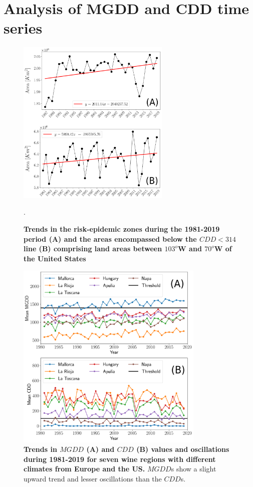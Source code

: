 \section{Analysis of MGDD and CDD time series}

\begin{figure}[H]
    \centering
    \includegraphics[width=0.65\textwidth]{Figures/CDD_risk_evol_USA.png}
    \caption[Comparison of risk areas and low CDD areas]{\textbf{Trends in the
            risk-epidemic zones during the 1981-2019
            period (A) and the areas encompassed below the $CDD < 314$ line (B)
            comprising
            land areas between $103^o$W and $70^o$W of the United States}}.
    \label{fig:sup_CDD_evol} %
\end{figure}

\begin{figure}[H]
    \centering
    \includegraphics[width=0.8\textwidth]{Figures/Mean_MGDD_CDD_sites.png}
    \caption[MGDD and CDD oscillations in different wine-growing
        regions]{\textbf{Trends in $MGDD$ (A) and $CDD$ (B) values and
            oscillations during 1981-2019 for seven wine regions with different
            climates
            from Europe and the US.} $MGDD$s show a slight upward trend and
        lesser
        oscillations than the $CDD$s.}
    \label{fig:sup_climatic_oscilations} %
\end{figure}

